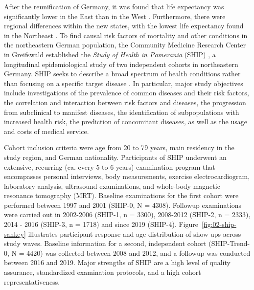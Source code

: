\documentclass[
  oneside]{book}
\begin{document}
After the reunification of Germany, it was found that life expectancy was significantly lower in the East than in the West \autocite{volzke2015prevalence}.
Furthermore, there were regional differences within the new states, with the lowest life expectancy found in the Northeast \autocite{volzke2015prevalence,wiesner2004life}.
To find causal risk factors of mortality and other conditions in the northeastern German population, the Community Medicine Research Center in Greifswald established the \emph{Study of Health in Pomerania} (SHIP) \autocite{Voelzke:SHIP11}, a longitudinal epidemiological study of two independent cohorts in northeastern Germany.
SHIP seeks to describe a broad spectrum of health conditions rather than focusing on a specific target disease \autocite{Voelzke:SHIP11}.
In particular, major study objectives include investigations of the prevalence of common diseases and their risk factors, the correlation and interaction between risk factors and diseases, the progression from subclinical to manifest diseases, the identification of subpopulations with increased health risk, the prediction of concomitant diseases, as well as the usage and costs of medical service.

Cohort inclusion criteria were age from 20 to 79 years, main residency in the study region, and German nationality.
Participants of SHIP underwent an extensive, recurring (ca. every 5 to 6 years) examination program that encompasses personal interviews, body measurements, exercise electrocardiogram, laboratory analysis, ultrasound examinations, and whole-body magnetic resonance tomography (MRT).
Baseline examinations for the first cohort were performed between 1997 and 2001 (SHIP-0, N = 4308).
Followup examinations were carried out in 2002-2006 (SHIP-1, n = 3300), 2008-2012 (SHIP-2, n = 2333), 2014 - 2016 (SHIP-3, n = 1718) and since 2019 (SHIP-4).
Figure~\ref{fig:02-ship-sankey} illustrates participant response and age distribution of show-ups across study waves.
Baseline information for a second, independent cohort (SHIP-Trend-0, N = 4420) was collected between 2008 and 2012, and a followup was conducted between 2016 and 2019.
Major strengths of SHIP are a high level of quality assurance, standardized examination protocols, and a high cohort representativeness.
\end{document}
